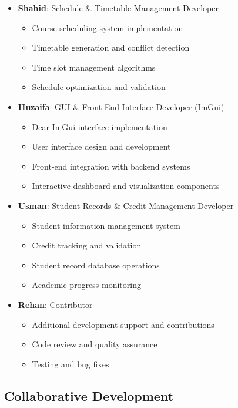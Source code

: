 \documentclass[12pt,a4paper]{article}
\begin{document}
\begin{itemize}
    \item \textbf{Shahid}: Schedule \& Timetable Management Developer
    \begin{itemize}
        \item Course scheduling system implementation
        \item Timetable generation and conflict detection
        \item Time slot management algorithms
        \item Schedule optimization and validation
    \end{itemize}
    
    \item \textbf{Huzaifa}: GUI \& Front-End Interface Developer (ImGui)
    \begin{itemize}
        \item Dear ImGui interface implementation
        \item User interface design and development
        \item Front-end integration with backend systems
        \item Interactive dashboard and visualization components
    \end{itemize}
    
    \item \textbf{Usman}: Student Records \& Credit Management Developer
    \begin{itemize}
        \item Student information management system
        \item Credit tracking and validation
        \item Student record database operations
        \item Academic progress monitoring
    \end{itemize}
    
    \item \textbf{Rehan}: Contributor
    \begin{itemize}
        \item Additional development support and contributions
        \item Code review and quality assurance
        \item Testing and bug fixes
    \end{itemize}
\end{itemize}

\subsection{Collaborative Development}
\end{document}
